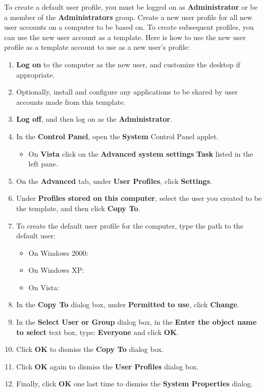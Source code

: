 To create a default user profile, you must be logged on as 
\textbf{Administrator} or be a member of the \textbf{Administrators} group.
Create a new user profile for all new user accounts on a computer to be
based on. To create subsequent profiles, you can use the new user account
as a template. Here is how to use the new user profile as a template account
to use as a new user's profile:
\begin{enumerate}
\item \textbf{Log on} to the computer as the new user, and customize the
desktop if appropriate. 
\item Optionally, install and configure any applications to be shared
by user accounts made from this template. 
\item \textbf{Log off}, and then log on as the \textbf{Administrator}. 
\item In the \textbf{Control Panel}, open the \textbf{System} Control Panel
 applet. 
 \begin{itemize}
 \item On \textbf{Vista} click on the 
 \textbf{Advanced system settings} \textbf{Task} listed in the left pane.
 \end{itemize} 
\item On the \textbf{Advanced} tab, under \textbf{User Profiles}, 
click \textbf{Settings}. 
\item Under \textbf{Profiles stored on this computer}, select the user
you created to be the template, and then click \textbf{Copy To}. 
\item To create the default user profile for the computer, type the path
to the default user:
 \begin{itemize}
 \item On Windows 2000: \verb@%WinDir%\Profiles\Default@;
 \item On Windows XP: \verb@%SystemDrive%\Documents and Settings\Defualt@;
 \item On Vista: \verb@%SystemDrive%\Users\Default@.
 \end{itemize}
\item In the \textbf{Copy To} dialog box, under \textbf{Permitted to use},
click \textbf{Change}. 
\item In the \textbf{Select User or Group} dialog box, in the 
\textbf{Enter the object name to select} text box, type: \textbf{Everyone}
and click \textbf{OK}.
\item Click \textbf{OK} to dismiss the \textbf{Copy To} dialog box.
\item Click \textbf{OK} again to dismiss the \textbf{User Profiles} dialog box.
\item Finally, click \textbf{OK} one last time to dismiss the
\textbf{System Properties} dialog.
\end{enumerate}

